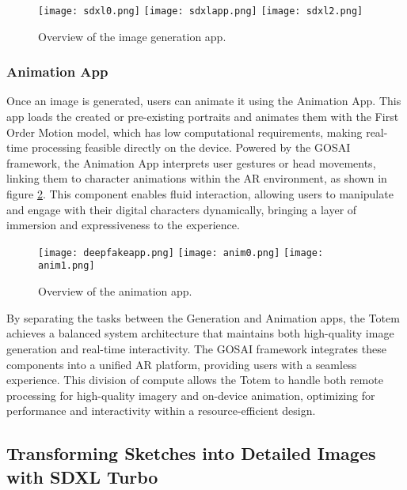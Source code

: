 \begin{figure}[!h]
    \centering
    \texttt{[image: sdxl0.png]}
    \texttt{[image: sdxlapp.png]}
    \texttt{[image: sdxl2.png]}
    \caption{Overview of the image generation app.}
    \vspace{0.1cm}
    \label{fig:imgenapp}
\end{figure}

\subsubsection{Animation App}

Once an image is generated, users can animate it using the Animation App.
This app loads the created or pre-existing portraits and animates them with the First Order Motion model, which has low computational requirements, making real-time processing feasible directly on the device.
Powered by the GOSAI framework, the Animation App interprets user gestures or head movements, linking them to character animations within the AR environment, as shown in figure \ref{fig:deepfakeapp}.
This component enables fluid interaction, allowing users to manipulate and engage with their digital characters dynamically, bringing a layer of immersion and expressiveness to the experience.

\begin{figure}[!h]
    \centering
    \texttt{[image: deepfakeapp.png]}
    \texttt{[image: anim0.png]}
    \texttt{[image: anim1.png]}
    \caption{Overview of the animation app.}
    \vspace{0.1cm}
    \label{fig:deepfakeapp}
\end{figure}

By separating the tasks between the Generation and Animation apps, the Totem achieves a balanced system architecture that maintains both high-quality image generation and real-time interactivity.
The GOSAI framework integrates these components into a unified AR platform, providing users with a seamless experience.
This division of compute allows the Totem to handle both remote processing for high-quality imagery and on-device animation, optimizing for performance and interactivity within a resource-efficient design.

\subsection{Transforming Sketches into Detailed Images with SDXL Turbo}

